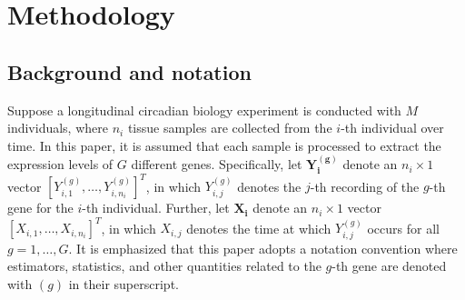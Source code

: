 \section{Methodology} \label{sec:2}


\subsection{Background and notation} \label{sec:2.1}

Suppose a longitudinal circadian biology experiment is conducted with $M$ individuals, where $n_i$ tissue samples are collected from the $i$-th individual over time. In this paper, it is assumed that each sample is processed to extract the expression levels of $G$ different genes. Specifically, let $\boldsymbol{Y_i^{(g)}}$ denote an $n_i\times 1$ vector $[Y^{(g)}_{i,1},\ldots, Y^{(g)}_{i,n_i}]^T$, in which $Y_{i,j}^{(g)}$ denotes the $j$-th recording of the $g$-th gene for the $i$-th individual. Further, let $\boldsymbol{X_i}$ denote an $n_i\times 1$ vector $[X_{i,1},\ldots, X_{i,n_i}]^T$, in which $X_{i,j}$ denotes the time at which $Y_{i,j}^{(g)}$ occurs for all $g = 1,\ldots, G$. It is emphasized that this paper adopts a notation convention where estimators, statistics, and other quantities related to the $g$-th gene are denoted with $(g)$ in their superscript.

